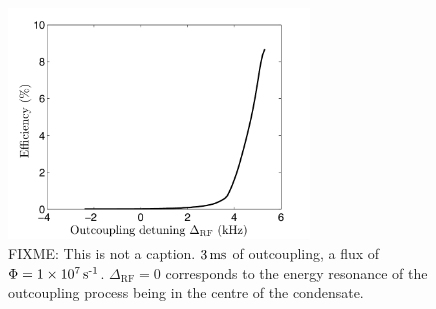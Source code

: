 \begin{figure}
    \centering
    \includegraphics[width=8cm]{3LevelModelEfficiency}
    \caption{FIXME: This is not a caption. $\unit[3]{ms}$ of outcoupling, a flux of $\Phi = 1\times \unit[10^7]{s\textsuperscript{-1}}$.  $\Delta_\text{RF} =0$ corresponds to the energy resonance of the outcoupling process being in the centre of the condensate.}
    \label{OpticalPumping:3LevelModelEfficiency}
\end{figure}

